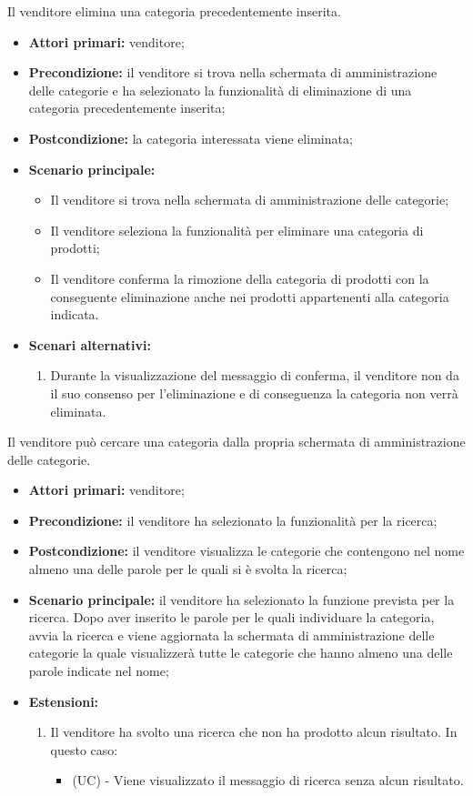 Il venditore elimina una categoria precedentemente inserita.
\begin{itemize}
    \item \textbf{Attori primari:} venditore;
    \item \textbf{Precondizione:} il venditore si trova nella schermata di amministrazione delle categorie e ha selezionato la funzionalità di eliminazione di una categoria precedentemente inserita;
    \item \textbf{Postcondizione:} la categoria interessata viene eliminata;
    \item \textbf{Scenario principale:}
    \begin{itemize}
    	\item Il venditore si trova nella schermata di amministrazione delle categorie;
    	\item Il venditore seleziona la funzionalità per eliminare una categoria di prodotti;
    	\item Il venditore conferma la rimozione della categoria di prodotti con la conseguente eliminazione anche nei prodotti appartenenti alla categoria indicata.
    \end{itemize}
    \item \textbf{Scenari alternativi:}
    \begin{enumerate}[label=\lett]
    	\item Durante la visualizzazione del messaggio di conferma, il venditore non da il suo consenso per l'eliminazione e di conseguenza la categoria non verrà eliminata.
    \end{enumerate}
\end{itemize}

Il venditore può cercare una categoria dalla propria schermata di amministrazione delle categorie.
\begin{itemize}
	\item \textbf{Attori primari:} venditore;
	\item \textbf{Precondizione:} il venditore ha selezionato la funzionalità per la ricerca;
	\item \textbf{Postcondizione:} il venditore visualizza le categorie che contengono nel nome almeno una delle parole per le quali si è svolta la ricerca;
	\item \textbf{Scenario principale:} il venditore ha selezionato la funzione prevista per la ricerca. Dopo aver inserito le parole per le quali individuare la categoria, avvia la ricerca e viene aggiornata la schermata di amministrazione delle categorie la quale visualizzerà tutte le categorie che hanno almeno una delle parole indicate nel nome;
	\item \textbf{Estensioni:}
	\begin{enumerate}[label=\lett]
		\item Il venditore ha svolto una ricerca che non ha prodotto alcun risultato. In questo caso:
		\begin{itemize}
			\item (UC) - Viene visualizzato il messaggio di ricerca senza alcun risultato.
		\end{itemize}
	\end{enumerate}
\end{itemize}
